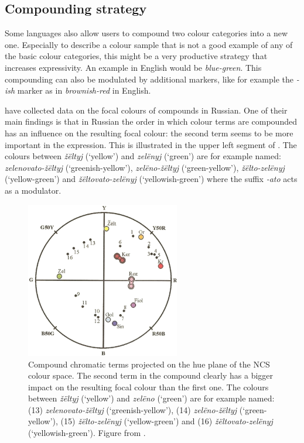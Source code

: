 \subsection{Compounding strategy}

Some languages also allow users to compound two colour categories into
a new one. Especially to describe a colour sample that is not a good
example of any of the basic colour categories, this might be a very
productive strategy that increases expressivity. An example in English
would be \textit{blue-green}. This compounding can also be modulated by
additional markers, like for example the \mbox{\textit{-ish}} marker as in
\textit{brownish-red} in English.

\cite{safuanova07russian} have collected data on the focal colours of
compounds in Russian. One of their main findings is that in Russian
the order in which colour terms are compounded has an influence on
the resulting focal colour: the second term seems to be more important
in the expression. This is illustrated in the upper left segment of
. The colours between \textit{\v
z\"eltyj} (`yellow') and \textit{zel\"enyj} (`green') are for example named:
\textit{zelenovato-\v z\"eltyj} (`greenish-yellow'), \textit{zel\"eno-\v z\"eltyj}
(`green-yellow'), \textit{\v z\"elto-zel\"enyj} (`yellow-green') and \linebreak\textit{\v
z\"eltovato-zel\"enyj} (`yellowish-green') where the suffix \textit{-ato}
acts as a modulator.

\begin{figure}[htbp]
  \begin{center}
   \includegraphics[width=0.6\textwidth]{./intro/figures/category-combination.pdf}
   \caption[Compound chromatic terms in Russian]{Compound chromatic
     terms projected on the hue plane of the NCS colour space. The
     second term in the compound clearly has a bigger impact on the
     resulting focal colour than the first one. The colours between
     \textit{\v z\"eltyj} (`yellow') and \textit{zel\"eno} (`green') are for example
     named: (13) \textit{zelenovato-\v z\"eltyj} (`greenish-yellow'), (14)
     \textit{zel\"eno-\v z\"eltyj} (`green-yellow'), (15) \textit{\v
     z\"elto-zel\"enyj} (`yellow-green') and (16) \textit{\v
     z\"eltovato-zel\"enyj} (`yellowish-green'). Figure from
     \cite{safuanova07russian}.}
    \label{f:category-combination}
  \end{center}
\end{figure}


